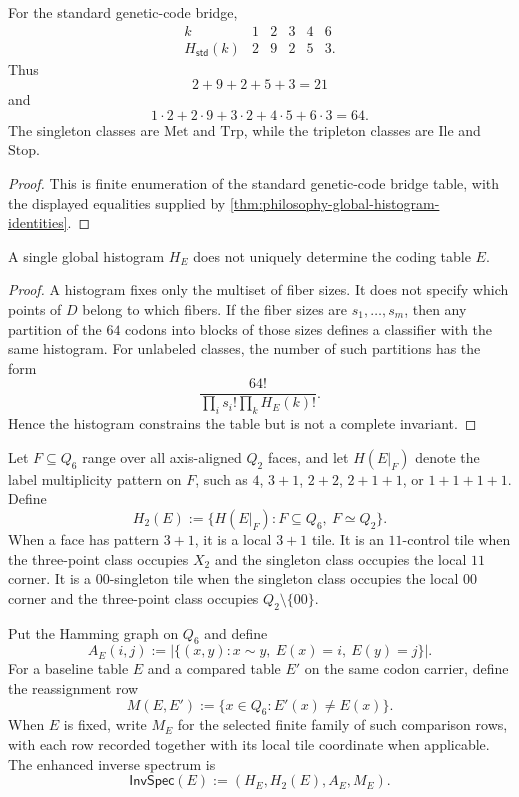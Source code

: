 \begin{corollary}
\label{cor:philosophy-standard-code-degeneracy-spectrum}
For the standard genetic-code bridge,
$$
\begin{array}{c|ccccc}
  k&1&2&3&4&6\\
\hline
  H_{\mathsf{std}}(k)&2&9&2&5&3.
\end{array}
$$
Thus
$$
  2+9+2+5+3=21
$$
and
$$
  1\cdot2+2\cdot9+3\cdot2+4\cdot5+6\cdot3=64.
$$
The singleton classes are $\mathrm{Met}$ and $\mathrm{Trp}$, while the
tripleton classes are $\mathrm{Ile}$ and $\mathrm{Stop}$.
\end{corollary}
\begin{proof}
This is finite enumeration of the standard genetic-code bridge table,
with the displayed equalities supplied by
\autoref{thm:philosophy-global-histogram-identities}.
\end{proof}

\begin{theorem}
\label{thm:philosophy-global-histogram-not-complete}
A single global histogram $H_{E}$ does not uniquely determine the coding
table $E$.
\end{theorem}
\begin{proof}
A histogram fixes only the multiset of fiber sizes. It does not specify
which points of $D$ belong to which fibers. If the fiber sizes are
$s_{1},\ldots,s_{m}$, then any partition of the $64$ codons into blocks of
those sizes defines a classifier with the same histogram. For unlabeled
classes, the number of such partitions has the form
$$
  \frac{64!}{\prod_{i}s_{i}!\prod_{k}H_{E}(k)!}.
$$
Hence the histogram constrains the table but is not a complete invariant.
\end{proof}

\begin{definition}
\label{def:philosophy-enhanced-codon-window-inverse-spectrum}
Let $F\subseteq Q_{6}$ range over all axis-aligned $Q_{2}$ faces, and
let $H(E|_{F})$ denote the label multiplicity pattern on $F$, such as
$4$, $3+1$, $2+2$, $2+1+1$, or $1+1+1+1$. Define
$$
  H_{2}(E):=\{H(E|_{F}):F\subseteq Q_{6},\ F\simeq Q_{2}\}.
$$
When a face has pattern $3+1$, it is a local $3+1$ tile. It is an
$11$-control tile when the three-point class occupies $X_{2}$ and the
singleton class occupies the local $11$ corner. It is a $00$-singleton
tile when the singleton class occupies the local $00$ corner and the
three-point class occupies $Q_{2}\setminus\{00\}$.

Put the Hamming graph on $Q_{6}$ and define
$$
  A_{E}(i,j):=
  |\{(x,y):x\sim y,\ E(x)=i,\ E(y)=j\}|.
$$
For a baseline table $E$ and a compared table $E'$ on the same codon
carrier, define the reassignment row
$$
  M(E,E'):=\{x\in Q_{6}:E'(x)\neq E(x)\}.
$$
When $E$ is fixed, write $M_{E}$ for the selected finite family of such
comparison rows, with each row recorded together with its local tile
coordinate when applicable.
The enhanced inverse spectrum is
$$
  \mathsf{InvSpec}(E):=(H_{E},H_{2}(E),A_{E},M_{E}).
$$
\end{definition}

